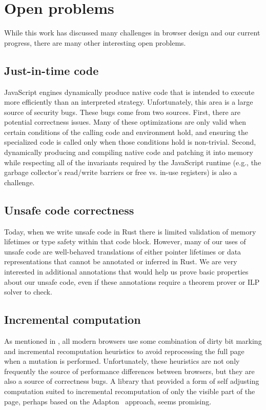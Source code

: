 
\section{Open problems}
\label{sec:open}
While this work has discussed many challenges in browser design and our current progress,
there are many other interesting open problems.

\subsection{Just-in-time code} JavaScript engines dynamically produce native code that is
intended to execute more efficiently than an interpreted strategy.
Unfortunately, this area is a large source of security bugs.
These bugs come from two sources.
First, there are potential correctness issues.
Many of these optimizations are only valid when certain conditions of the calling
code and environment hold, and ensuring the specialized code is called only when those
conditions hold is non-trivial.
Second, dynamically producing and compiling native code and patching it into memory
while respecting all of the invariants required by the JavaScript runtime (e.g., the
garbage collector's read/write barriers or free vs. in-use registers) is also a challenge.

\subsection{Unsafe code correctness} Today, when we write unsafe code in Rust
there is limited validation of memory lifetimes or type safety within that
code block.
However, many of our uses of unsafe code are well-behaved translations of
either pointer lifetimes or data representations that cannot be annotated
or inferred in Rust.
We are very interested in additional annotations that would help us prove
basic properties about our unsafe code, even if these annotations require a
theorem prover or ILP solver to check.

\subsection{Incremental computation} As mentioned in ,
all modern browsers use some combination of dirty bit marking and incremental
recomputation heuristics to avoid reprocessing the full page when
a mutation is performed.
Unfortunately, these heuristics are not only frequently the source of
performance differences between browsers, but they are also a source of
correctness bugs.
A library that provided a form of self adjusting computation suited to
incremental recomputation of only the visible part of the page, perhaps
based on the Adapton~\cite{adapton} approach, seems promising.


